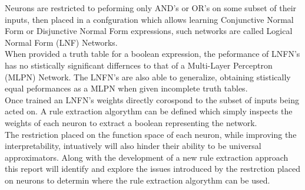 Neurons are restricted to peforming only AND's or OR's on some subset of their inputs, then placed in a confguration which allows learning Conjunctive Normal Form or Disjunctive Normal Form expressions, such networks are called Logical Normal Form (LNF) Networks.\\

When provided a truth table for a boolean expression, the peformance of LNFN's has no stistically significant differnces to that of a Multi-Layer Perceptron (MLPN) Network. The LNFN's are also able to generalize, obtaining stistically equal peformances as a MLPN when given incomplete truth tables.\\

Once trained an LNFN's weights directly corospond to the subset of inputs being acted on. A rule extraction algorythm can be defined which simply inspects the weights of each neuron to extract a boolean representing the network.\\

The restriction placed on the function space of each neuron, while improving the interpretability, intuatively will also hinder their ability to be universal approximators. Along with the development of a new rule extraction approach this report will identify and explore the issues introduced by the restrction placed on neurons to determin where the rule extraction algorythm can be used.\\

